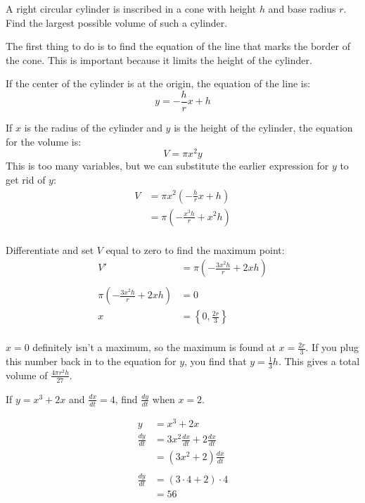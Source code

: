 \documentclass[fleqn,addpoints]{exam}
\begin{document}
\begin{questions}
\begin{solution}
\end{solution}

\question A right circular cylinder is inscribed in a cone with height $h$ and base radius $r$. Find the largest
possible volume of such a cylinder.

\begin{solution}
The first thing to do is to find the equation of the line that marks the border of the cone.  This is important because
it limits the height of the cylinder.

If the center of the cylinder is at the origin, the equation of the line is:
\[
  y = -\frac{h}{r} x + h
\]

If $x$ is the radius of the cylinder and $y$ is the height of the cylinder, the equation for the volume is:
\[
  V = \pi x^2y
\]
This is too many variables, but we can substitute the earlier expression for $y$ to get rid of $y$:
\begin{align*}
  V &= \pi x^2 \left( -\frac{h}{r} x + h \right) \\
    &= \pi \left( - \frac{x^3 h}{r} + x^2h \right) \\
\end{align*}

Differentiate and set $V$ equal to zero to find the maximum point:
\begin{align*}
  V'  &= \pi \left( -\frac{3x^2 h}{r} + 2xh \right) \\
\\
  \pi \left( - \frac{3x^2 h}{r} + 2xh \right) &= 0 \\
  x &= \left\{0, \frac{2r}{3} \right\} \\
\end{align*}

$x = 0$  definitely isn't a maximum, so the maximum is found at $x = \frac{2r}{3}$.  If you plug this number back in to the
equation for $y$, you find that $y = \frac{1}{3} h$.  This gives a total volume of $\frac{4 \pi r^2h}{27}$.

\end{solution}

\ifprintanswers
\pagebreak
\fi

\question If $y=x^3+2x$ and $\frac{dx}{dt} = 4$, find $\frac{dy}{dt}$ when $x=2$.
\begin{solution}
\begin{align*}
  y &= x^3 + 2x \\
  \frac{dy}{dt} &= 3x^2 \frac{dx}{dt} + 2 \frac{dx}{dt} \\
  &= (3x^2 + 2 )\frac{dx}{dt} \\
\\
  \frac{dy}{dt} &= (3 \cdot 4 + 2) \cdot 4 \\
    &= 56 \\
\end{align*}


\end{solution}
\end{questions}
\end{document}
